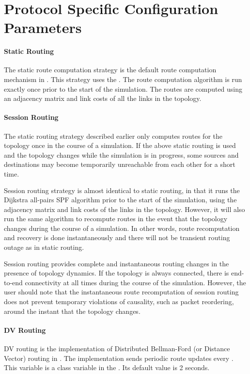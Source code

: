 \section{Protocol Specific Configuration Parameters}
\label{sec:uni:protconfig}

\paragraph{Static Routing}
The static route computation strategy is
the default route computation mechanism  in \ns.
This strategy uses the
.
The route computation algorithm is run exactly once
prior to the start of the simulation.
The routes are computed
using an adjacency matrix and link costs of all the links in the topology.

\paragraph{Session Routing}
The static routing strategy described earlier
only computes routes for the topology once in the course of a simulation.
If the above static routing is used and the topology changes while the
simulation is in progress, some sources and destinations may become
temporarily unreachable from each other for a short time.

Session routing strategy is almost identical to static routing,
in that it runs the Dijkstra all-pairs SPF algorithm
prior to the start of the simulation, using the
adjacency matrix and link costs of the links in the topology.
However, it will also run the same algorithm to recompute routes
in the event that the topology changes during the course of a
simulation. 
In other words, route recomputation and recovery is done
instantaneously and there will not be transient routing outage as in
static routing. 

Session routing provides complete and instantaneous routing changes 
in the presence of topology dynamics.
If the topology is always connected, there is
end-to-end connectivity at all times during the course of the simulation.
However, the user should note that the instantaneous route recomputation 
of session routing does not prevent temporary violations of causality,
such as packet reordering, around the instant that the topology
changes. 

\paragraph{DV Routing}
DV routing is the implementation of
Distributed Bellman-Ford (or Distance Vector) routing in \ns.
The implementation sends periodic route updates every .
This variable is a class variable in the .
Its default value is 2 seconds.

